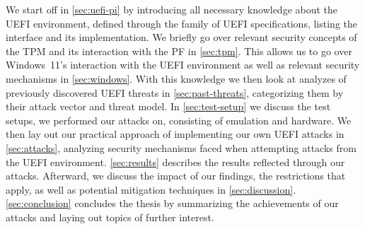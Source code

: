 We start off in \autoref{sec:uefi-pi} by introducing all necessary knowledge about the \ac{UEFI} environment, defined through the family of \ac{UEFI} specifications, listing the interface and its implementation.
We briefly go over relevant security concepts of the \ac{TPM} and its interaction with the \ac{PF} in \autoref{sec:tpm}.
This allows us to go over Windows~11's interaction with the \ac{UEFI} environment as well as relevant security mechanisms in \autoref{sec:windows}.
With this knowledge we then look at analyzes of previously discovered \ac{UEFI} threats in \autoref{sec:past-threats}, categorizing them by their attack vector and threat model.
In \autoref{sec:test-setup} we discuss the test setups, we performed our attacks on, consisting of emulation and hardware.
We then lay out our practical approach of implementing our own \ac{UEFI} attacks in \autoref{sec:attacks}, analyzing security mechanisms faced when attempting attacks from the \ac{UEFI} environment.
\autoref{sec:results} describes the results reflected through our attacks.
Afterward, we discuss the impact of our findings, the restrictions that apply, as well as potential mitigation techniques in \autoref{sec:discussion}.
\autoref{sec:conclusion} concludes the thesis by summarizing the achievements of our attacks and laying out topics of further interest.